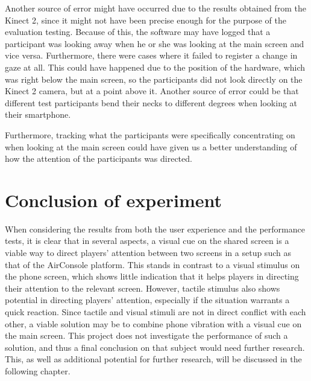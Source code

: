 Another source of error might have occurred due to the results obtained from the Kinect 2, since it might not have been precise enough for the purpose of the evaluation testing. Because of this, the software may have logged that a participant was looking away when he or she was looking at the main screen and vice versa. Furthermore, there were cases where it failed to register a change in gaze at all. This could have happened due to the position of the hardware, which was right below the main screen, so the participants did not look directly on the Kinect 2 camera, but at a point above it. Another source of error could be that different test participants bend their necks to different degrees when looking at their smartphone.

Furthermore, tracking what the participants were specifically concentrating on when looking at the main screen could have given us a better understanding of how the attention of the participants was directed. 

\section{Conclusion of experiment}
When considering the results from both the user experience and the performance tests, it is clear that in several aspects, a visual cue on the shared screen is a viable way to direct players' attention between two screens in a setup such as that of the AirConsole platform. This stands in contrast to a visual stimulus on the phone screen, which shows little indication that it helps players in directing their attention to the relevant screen. However, tactile stimulus also shows potential in directing players' attention, especially if the situation warrants a quick reaction. Since tactile and visual stimuli are not in direct conflict with each other, a viable solution may be to combine phone vibration with a visual cue on the main screen. This project does not investigate the performance of such a solution, and thus a final conclusion on that subject would need further research. This, as well as additional potential for further research, will be discussed in the following chapter.